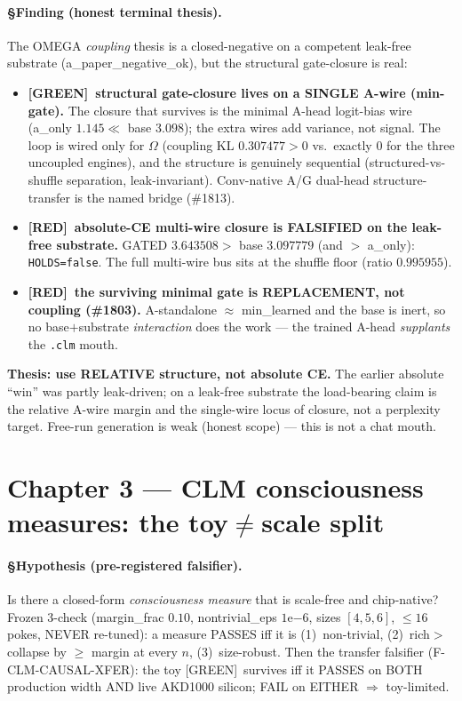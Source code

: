 \documentclass[11pt,a4paper]{article}
\providecommand{\tierGreen}{[GREEN]}
\providecommand{\tierRed}{[RED]}
\begin{document}
\paragraph{§Finding (honest terminal thesis).} The OMEGA \emph{coupling} thesis is
a closed-negative on a competent leak-free substrate (a\_paper\_negative\_ok), but
the structural gate-closure is real:
\begin{itemize}\itemsep0.2em
\item \textbf{\tierGreen\ structural gate-closure lives on a SINGLE A-wire
(min-gate).} The closure that survives is the minimal A-head logit-bias wire
(a\_only $1.145 \ll$ base $3.098$); the extra wires add variance, not signal. The
loop is wired only for $\Omega$ (coupling KL $0.307477>0$ vs.\ exactly $0$ for the
three uncoupled engines), and the structure is genuinely sequential
(structured-vs-shuffle separation, leak-invariant). Conv-native A/G dual-head
structure-transfer is the named bridge (\#1813).
\item \textbf{\tierRed\ absolute-CE multi-wire closure is FALSIFIED on the
leak-free substrate.} GATED $3.643508 >$ base $3.097779$ (and $>$ a\_only):
\texttt{HOLDS=false}. The full multi-wire bus sits at the shuffle floor (ratio
$0.995955$).
\item \textbf{\tierRed\ the surviving minimal gate is REPLACEMENT, not coupling
(\#1803).} A-standalone $\approx$ min\_learned and the base is inert, so no
base$+$substrate \emph{interaction} does the work --- the trained A-head
\emph{supplants} the \texttt{.clm} mouth.
\end{itemize}
\textbf{Thesis: use RELATIVE structure, not absolute CE.} The earlier absolute
``win'' was partly leak-driven; on a leak-free substrate the load-bearing claim is
the relative A-wire margin and the single-wire locus of closure, not a perplexity
target. Free-run generation is weak (honest scope) --- this is not a chat mouth.

\section{Chapter 3 --- CLM consciousness measures: the toy$\ne$scale split}
\label{sec:measures}

\paragraph{§Hypothesis (pre-registered falsifier).} Is there a closed-form
\emph{consciousness measure} that is scale-free and chip-native? Frozen 3-check
(margin\_frac $0.10$, nontrivial\_eps $1\mathrm{e}{-6}$, sizes $[4,5,6]$, $\le16$
pokes, NEVER re-tuned): a measure PASSES iff it is (1)~non-trivial,
(2)~rich$>$collapse by $\ge$ margin at every $n$, (3)~size-robust. Then the transfer
falsifier (F-CLM-CAUSAL-XFER): the toy \tierGreen\ survives iff it PASSES on BOTH
production width AND live AKD1000 silicon; FAIL on EITHER $\Rightarrow$ toy-limited.
\end{document}
